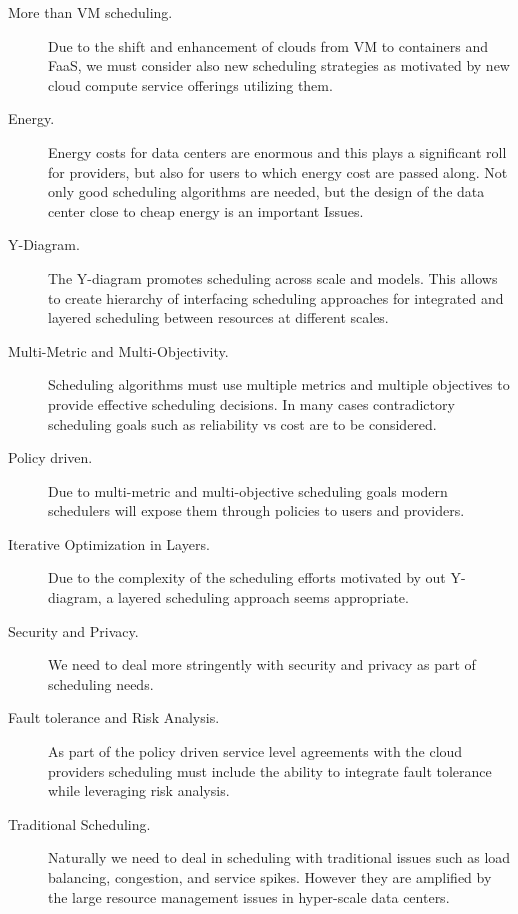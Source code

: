 \documentclass[final,5p,times,twocolumn]{elsarticle}
\begin{document}
\begin{description}

\item[More than VM scheduling.] Due to the shift and enhancement of
clouds from VM to containers and FaaS, we must consider also new
scheduling strategies as motivated by new cloud compute service
offerings utilizing them.

\item[Energy.] Energy costs for data centers are enormous and this
plays a significant roll for providers, but also for users to which
energy cost are passed along. Not only good scheduling algorithms are
needed, but the design of the data center close to cheap energy is an
important Issues.

\item[Y-Diagram.] The Y-diagram promotes scheduling across scale and
models. This allows to create hierarchy of interfacing scheduling
approaches for integrated and layered scheduling between resources at
different scales.

\item[Multi-Metric and Multi-Objectivity.] Scheduling algorithms must
use multiple metrics and multiple objectives to provide effective
scheduling decisions. In many cases contradictory scheduling goals
such as reliability vs cost are to be considered.

\item[Policy driven.] Due to multi-metric and multi-objective
scheduling goals modern schedulers will expose them through policies
to users and providers.


\item[Iterative Optimization in Layers.] Due to the complexity of the
scheduling efforts motivated by out Y-diagram, a layered scheduling
approach seems appropriate.


\item[Security and Privacy.]  We need to deal more stringently with
security and privacy as part of scheduling needs.

\item[Fault tolerance and Risk Analysis.] As part of the policy driven
service level agreements with the cloud providers scheduling must
include the ability to integrate fault tolerance while leveraging risk
analysis.

\item[Traditional Scheduling.] Naturally we need to deal in scheduling
with traditional issues such as load balancing, congestion, and
service spikes. However they are amplified by the large resource
management issues in hyper-scale data centers.



\end{description}
\end{document}

